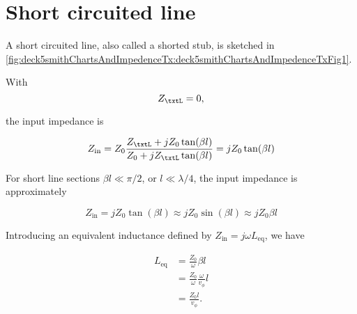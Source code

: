 %
%

\section{Short circuited line}

A short circuited line, also called a shorted stub, is sketched in \cref{fig:deck5smithChartsAndImpedenceTx:deck5smithChartsAndImpedenceTxFig1}.


With
\begin{equation}\label{eqn:uwavesDeck5SmithChartCore:20}
Z_\txtL = 0,
\end{equation}

the input impedance is

\begin{equation}\label{eqn:uwavesDeck5SmithChartCore:40}
Z_{\textrm{in}}
= Z_0 \frac{ Z_\txtL + j Z_0 \tan(\beta l) }{ Z_0 + j Z_\txtL \tan(\beta l)}
= j Z_0 \tan(\beta l)
\end{equation}

%
%

For short line sections \( \beta l \ll \pi/2 \), or \( l \ll \lambda/4 \), the input impedance is approximately

\begin{equation}\label{eqn:uwavesDeck5SmithChartCore:80}
Z_{\textrm{in}}
= j Z_0 \tan(\beta l)
\approx j Z_0 \sin(\beta l)
\approx j Z_0 \beta l
\end{equation}

Introducing an equivalent inductance defined by \( Z_{\textrm{in}} = j \omega L_{\mathrm{eq}} \), we have

\begin{equation}\label{eqn:uwavesDeck5SmithChartCore:100}
\begin{aligned}
L_{\mathrm{eq}}
&=
\frac{Z_0}{\omega} \beta l
\\ &=
\frac{Z_0}{\omega} \frac{\omega}{v_\phi} l
\\ &=
\frac{Z_0 l}{v_\phi}.
\end{aligned}
\end{equation}

